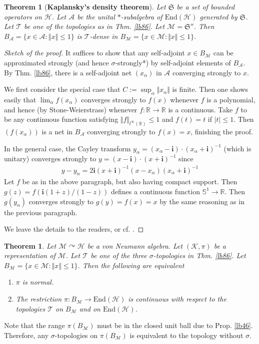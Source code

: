 \documentclass[12pt,b5paper,notitlepage]{article}
\theoremstyle{definition}
\theoremstyle{plain}
\newtheorem{thm}[df]{Theorem}
\newcommand{\fk}{\mathfrak}
\newcommand{\mc}{\mathcal}
\newcommand{\End}{\mathrm{End}} %
\newcommand{\im}{\mathbf{i}}
\newcommand{\mbb}{\mathbb}
\newcommand{\Rbb}{\mathbb R}
\numberwithin{equation}{section}
\begin{document}
\begin{thm}[\textbf{Kaplansky's density theorem}]\label{lb88}
Let $\fk S$ be a set of bounded operators on $\mc H$. Let $\mc A$ be the unital $*$-subalgebra of $\End(\mc H)$ generated by $\fk S$. Let $\mc T$ be one of the topologies as in Thm. \ref{lb86}. Let $\mc M=\fk S''$. Then $B_{\mc A}=\{x\in\mc A:\Vert x\Vert\leq 1\}$ is $\mc T$-dense in $B_{\mc M}=\{x\in\mc M:\Vert x\Vert\leq 1\}$.
\end{thm}




\begin{proof}[Sketch of the proof]
It suffices to show that any self-adjoint $x\in B_{\mc M}$ can be approximated strongly (and hence $\sigma$-strongly*) by self-adjoint elements of $B_{\mc A}$. By Thm. \ref{lb86}, there is a self-adjoint net  $(x_\alpha)$ in $\mc A$ converging strongly to $x$.  

We first consider the special case that $C:=\sup_\alpha\Vert x_\alpha\Vert$ is finite. Then one shows easily that $\lim_\alpha f(x_\alpha)$ converges strongly to $f(x)$ whenever $f$ is a polynomial, and hence (by Stone-Weierstrass) whenever $f:\Rbb\rightarrow\Rbb$ is a continuous. Take $f$ to be any continuous function satisfying $\Vert f\Vert_{l^\infty(\Rbb)}\leq 1$ and $f(t)=t$ if $|t|\leq 1$. Then $(f(x_\alpha))$ is a net in $B_{\mc A}$ converging strongly to $f(x)=x$, finishing the proof.

In the general case, the Cayley transform $y_\alpha=(x_\alpha-\im)\cdot (x_\alpha+\im)^{-1}$ (which is unitary) converges strongly to $y=(x-\im)\cdot (x+\im)^{-1}$ since
\begin{align*}
y-y_\alpha=2\im(x+\im)^{-1}(x-x_\alpha)(x_\alpha+\im)^{-1}
\end{align*}
Let $f$ be as in the above paragraph, but also having compact support. Then $g(z)=f(\im(1+z)/(1-z))$ defines a continuous function $\mbb S^1\rightarrow\Rbb$. Then $g(y_\alpha)$ converges strongly to $g(y)=f(x)=x$ by the same reasoning as in the previous paragraph.

We leave the details to the readers, or cf. \cite[Sec. 5.3]{Kad}. 
\end{proof}

\begin{thm}\label{lb99}
Let $\mc M\curvearrowright\mc H$ be a von Neumann algebra. Let $(\mc K,\pi)$ be a representation of $\mc M$. Let $\mc T$ be one of the three $\sigma$-topologies in Thm. \ref{lb86}. Let $B_{\mc M}=\{x\in\mc M:\Vert x\Vert\leq1\}$. Then the following are equivalent
\begin{enumerate}
\item[(1)]  $\pi$ is normal.
\item[(2)] The restriction $\pi:B_{\mc M}\rightarrow\End(\mc H)$ is continuous with respect to the topologies $\mc T$ on $B_{\mc M}$ and on $\End(\mc H)$.
\end{enumerate}
\end{thm}
Note that the range $\pi(B_{\mc M})$ must be in the closed unit ball due to Prop. \ref{lb46}. Therefore, any $\sigma$-topologies on $\pi(B_{\mc M})$ is equivalent to the topology without $\sigma$.
\end{document}
